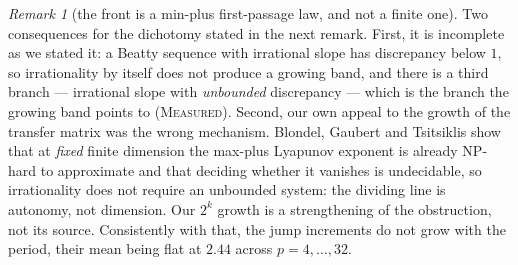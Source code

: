 \documentclass[11pt]{article}
\theoremstyle{definition}
\theoremstyle{remark}
\newtheorem{remark}[theorem]{Remark}
\newcommand{\MEASURED}{\textsc{Measured}}
\begin{document}
\begin{remark}[the front is a min-plus first-passage law, and not a finite one]
Two consequences for the dichotomy stated in the next remark. First, it is incomplete as we stated it:
a Beatty sequence with irrational slope has discrepancy below $1$, so irrationality by itself does not
produce a growing band, and there is a third branch --- irrational slope with \emph{unbounded}
discrepancy --- which is the branch the growing band points to (\MEASURED). Second, our own appeal to the growth of the
transfer matrix was the wrong mechanism. Blondel, Gaubert and Tsitsiklis \cite{BGT} show that at
\emph{fixed} finite dimension the max-plus Lyapunov exponent is already NP-hard to approximate and that
deciding whether it vanishes is undecidable, so irrationality does not require an unbounded system: the
dividing line is autonomy, not dimension. Our $2^{k}$ growth is a strengthening of the obstruction, not
its source. Consistently with that, the jump increments do not grow with the period, their mean being
flat at $2.44$ across $p=4,\dots,32$.
\end{remark}
\end{document}
